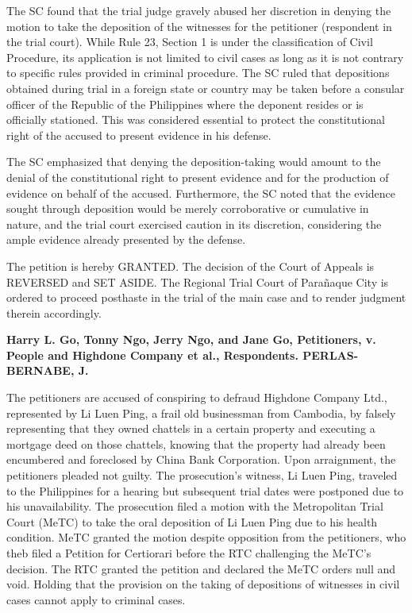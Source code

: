 \documentclass[
12pt,
oneside,
onehalfspacing,
headsepline
]{DigestCollection}
\begin{document}
The SC found that the trial judge gravely abused her discretion in denying the motion to take the deposition of the witnesses for the petitioner (respondent in the trial court). While Rule 23, Section 1 is under the classification of Civil Procedure, its application is not limited to civil cases as long as it is not contrary to specific rules provided in criminal procedure. The SC ruled that depositions obtained during trial in a foreign state or country may be taken before a consular officer of the Republic of the Philippines where the deponent resides or is officially stationed. This was considered essential to protect the constitutional right of the accused to present evidence in his defense.

The SC emphasized that denying the deposition-taking would amount to the denial of the constitutional right to present evidence and for the production of evidence on behalf of the accused. Furthermore, the SC noted that the evidence sought through deposition would be merely corroborative or cumulative in nature, and the trial court exercised caution in its discretion, considering the ample evidence already presented by the defense.

The petition is hereby GRANTED. The decision of the Court of Appeals is REVERSED and SET ASIDE. The Regional Trial Court of Parañaque City is ordered to proceed posthaste in the trial of the main case and to render judgment therein accordingly.

\label{1bb13ed0-0a10-11ef-932c-63c852f65e48}


\noindent\textbf{Harry L. Go, Tonny Ngo, Jerry Ngo, and Jane Go, Petitioners, v. \\People and Highdone Company et al., Respondents. PERLAS-BERNABE, J.}\vspace{0.4cm}

The petitioners are accused of conspiring to defraud Highdone Company Ltd., represented by Li Luen Ping, a frail old businessman from Cambodia, by falsely representing that they owned chattels in a certain property and executing a mortgage deed on those chattels, knowing that the property had already been encumbered and foreclosed by China Bank Corporation. Upon arraignment, the petitioners pleaded not guilty. The prosecution's witness, Li Luen Ping, traveled to the Philippines for a hearing but subsequent trial dates were postponed due to his unavailability. The prosecution filed a motion with the Metropolitan Trial Court (MeTC) to take the oral deposition of Li Luen Ping due to his health condition. MeTC granted the motion despite opposition from the petitioners, who theb filed a Petition for Certiorari before the RTC challenging the MeTC's decision. The RTC granted the petition and declared the MeTC orders null and void. Holding that the provision on the taking of depositions of witnesses in civil cases cannot apply to criminal cases.
\end{document}
